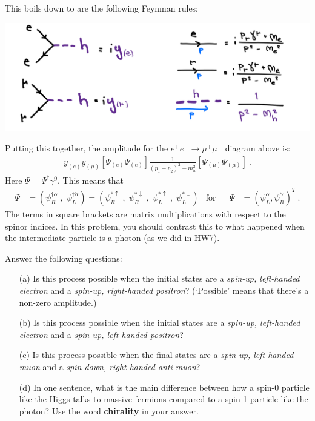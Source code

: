 \documentclass[12pt]{article}
\begin{document}
This boils down to are the following Feynman rules:
\begin{center}
\includegraphics[width=.7\textwidth]{HW8bb.png}	
\end{center}

Putting this together, the amplitude for the $e^+e^-\to\mu^+\mu^-$ diagram above is:
\begin{align}
	y_{(e)} y_{(\mu)}\left[\bar\Psi_{(e)} \Psi_{(e)}\right] \frac{1}{(p_1+p_2)^2 - m_h^2} \left[\bar\Psi_{(\mu)} \Psi_{(\mu)}\right] \ .
\end{align}
Here $\bar\Psi = \Psi^\dag \gamma^0$. This means that
\begin{align}
	\bar\Psi &= (\psi_R^{\dag\alpha}\;,\; \psi_L^{\dag\dot\alpha}) 
	= ( \psi_R^{*\uparrow} \;,\;
	\psi_R^{*\downarrow} \;,\;
	\psi_L^{*\uparrow} \;,\;
	\psi_L^{*\downarrow} )
	&\text{for}
	&
	&
	\Psi &= (\psi_L^\alpha, \psi_R^{\dot\alpha})^T \ .
\end{align}
The terms in square brackets are matrix multiplications with respect to the spinor indices.
In this problem, you should contrast this to what happened when the intermediate particle is a photon (as we did in HW7).

Answer the following questions:
\begin{enumerate}
	\item[(a)] Is this process possible when the initial states are a \emph{spin-up, left-handed electron} and a \emph{spin-up, right-handed positron}? (`Possible' means that there's a non-zero amplitude.)
	\item[(b)] Is this process possible when the initial states are a \emph{spin-up, left-handed electron} and a \emph{spin-up, left-handed positron}? 
	\item[(c)] Is this process possible when the final states are a \emph{spin-up, left-handed muon} and a \emph{spin-down, right-handed anti-muon}? 
	\item[(d)] In one sentence, what is the main difference between how a spin-0 particle like the Higgs talks to massive fermions compared to a spin-1 particle like the photon? Use the word \textbf{chirality} in your answer.
\end{enumerate}
\end{document}

